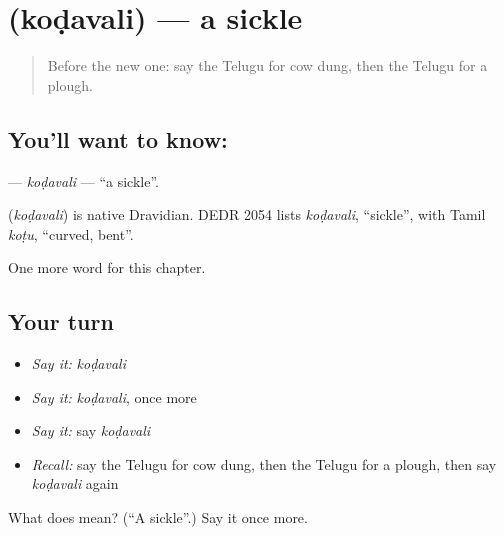 \section[\texorpdfstring{\te{కొడవలి} (koḍavali)}{కొడవలి (koḍavali)}]{ (koḍavali) — a sickle}

\label{lesson:TE-C234-kodavali}



\begin{quote}
Before the new one: say the Telugu for cow dung, then the Telugu for a plough.
\end{quote}

\subsection*{You'll want to know: }
\textbf{} — \emph{koḍavali} — \textquotedblleft{}a sickle\textquotedblright{}.

\begin{cousinweb}
\textbf{} (\emph{koḍavali}) is native Dravidian. DEDR 2054 lists \emph{koḍavali}, \textquotedblleft{}sickle\textquotedblright{}, with Tamil \emph{koṭu}, \textquotedblleft{}curved, bent\textquotedblright{}.
\end{cousinweb}

\begin{grammarlens}[title={What you've built}]
One more word for this chapter.
\end{grammarlens}

\subsection*{Your turn}
\begin{itemize}
\raggedright
  \item \emph{Say it:} \emph{koḍavali}
  \item \emph{Say it:} \emph{koḍavali}, once more
  \item \emph{Say it:} say \emph{koḍavali}
  \item \emph{Recall:} say the Telugu for cow dung, then the Telugu for a plough, then say \emph{koḍavali} again
\end{itemize}

\begin{tcolorbox}[breakable,colback=teal!4,colframe=teal!35!black,title={Before you move on}]
What does  mean? (\textquotedblleft{}A sickle\textquotedblright{}.) Say it once more.
\end{tcolorbox}
